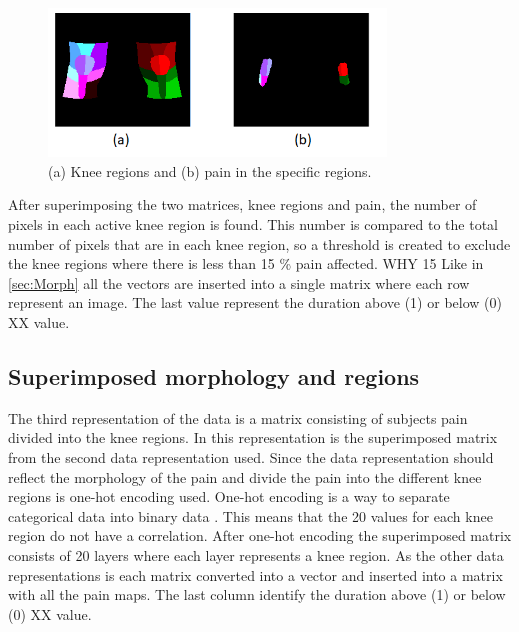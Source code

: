 \begin{figure} [H]
\centering
\includegraphics[width=0.8\textwidth]{figures/binregions}
\caption{(a) Knee regions and (b) pain in the specific regions.}
\label{fig:binregions}
\end{figure}

\noindent
After superimposing the two matrices, knee regions and pain, the number of pixels in each active knee region is found. This number is compared to the total number of pixels that are in each knee region, so a threshold is created to exclude the knee regions where there is less than 15 \% pain affected. WHY 15%
Like in \ref{sec:Morph} all the vectors are inserted into a single matrix where each row represent an image. The last value represent the duration above (1) or below (0) XX value.


\subsection{Superimposed morphology and regions}
The third representation of the data is a matrix consisting of subjects pain divided into the knee regions.
\noindent
In this representation is the superimposed matrix from the second data representation used. Since the data representation should reflect the morphology of the pain and divide the pain into the different knee regions is one-hot encoding used. One-hot encoding is a way to separate categorical data into binary data \citep{Harris2012}. This means that the 20 values for each knee region do not have a correlation. After one-hot encoding the superimposed matrix consists of 20 layers where each layer represents a knee region.
As the other data representations is each matrix converted into a vector and inserted into a matrix with all the pain maps. The last column identify the duration above (1) or below (0) XX value. 

